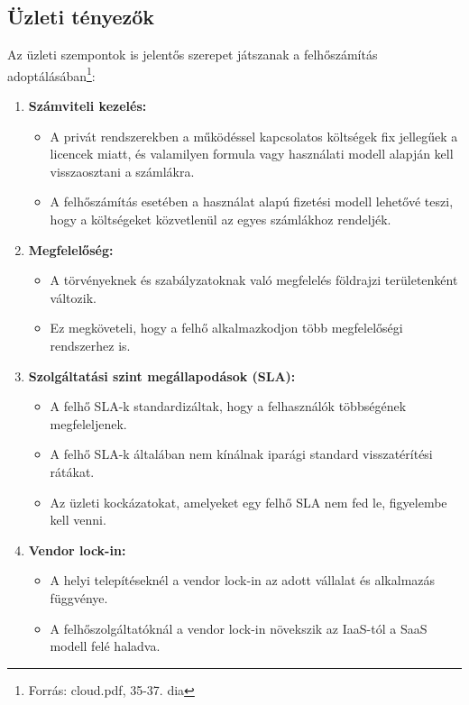 \documentclass[a4paper,12pt]{article}
\begin{document}
    \subsection{Üzleti tényezők}

    Az üzleti szempontok is jelentős szerepet játszanak a felhőszámítás adoptálásában\footnote{Forrás: cloud.pdf, 35-37. dia}:

    \begin{enumerate}
        \item \textbf{Számviteli kezelés:}
        \begin{itemize}
            \item A privát rendszerekben a működéssel kapcsolatos költségek fix jellegűek a licencek miatt, és valamilyen formula vagy használati modell alapján kell visszaosztani a számlákra.
            \item A felhőszámítás esetében a használat alapú fizetési modell lehetővé teszi, hogy a költségeket közvetlenül az egyes számlákhoz rendeljék.
        \end{itemize}

        \item \textbf{Megfelelőség:}
        \begin{itemize}
            \item A törvényeknek és szabályzatoknak való megfelelés földrajzi területenként változik.
            \item Ez megköveteli, hogy a felhő alkalmazkodjon több megfelelőségi rendszerhez is.
        \end{itemize}

        \item \textbf{Szolgáltatási szint megállapodások (SLA):}
        \begin{itemize}
            \item A felhő SLA-k standardizáltak, hogy a felhasználók többségének megfeleljenek.
            \item A felhő SLA-k általában nem kínálnak iparági standard visszatérítési rátákat.
            \item Az üzleti kockázatokat, amelyeket egy felhő SLA nem fed le, figyelembe kell venni.
        \end{itemize}

        \item \textbf{Vendor lock-in:}
        \begin{itemize}
            \item A helyi telepítéseknél a vendor lock-in az adott vállalat és alkalmazás függvénye.
            \item A felhőszolgáltatóknál a vendor lock-in növekszik az IaaS-tól a SaaS modell felé haladva.
        \end{itemize}
    \end{enumerate}
\end{document}
